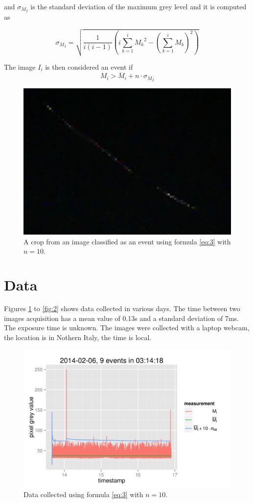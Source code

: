 \documentclass[a4paper,12pt]{article}
\begin{document}
 and ${\sigma_{M}}_{i}$ is the standard deviation of the maximum grey level and it is computed as

 $${\sigma_{M}}_{i}=\sqrt{\frac{1}{i(i-1)}\left(i\sum_{k=1}^i {M_k}^2-\left(\sum_{k=1}^i M_k\right)^2\right)}$$


The image $I_i$ is then considered an event if 
\begin{equation}
M_i>\overline{M}_i+n\cdot{\sigma_{M}}_{i}\label{eq:3}
\end{equation}

\begin{figure}[h!]
  \centering
  \includegraphics[scale=0.5]{bella.png}
  \caption{A crop from an image classified as an event using formula \ref{eq:3} with $n=10$.}
\end{figure}

\section{Data}
Figures \ref{fig:1} to \ref{fig:2} shows data collected in various days.
The time between two images acquisition has a mean value of 0.13s and a standard deviation of 7ms.
The exposure time is unknown.
The images were collected with a laptop webcam, the location is in Nothern Italy, the time is local.

\begin{figure}[h!]
  \centering
  \includegraphics{20140206.png}
  \caption{Data collected using formula \ref{eq:3} with $n=10$.}\label{fig:1}
\end{figure}
\end{document}
